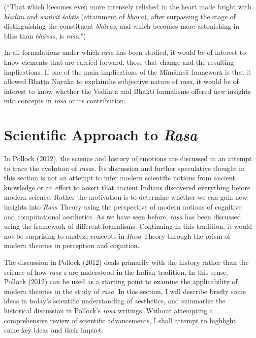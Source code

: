 (``That which becomes even more intensely relished in the heart made bright with \textsl{hlādinī} and \textsl{saṁvit} \textsl{śaktis} (attainment of \textsl{bhāva}), after surpassing the stage of distinguishing the constituent \textsl{bhāvas}, and which becomes more astonishing in bliss than \textsl{bhāvas}, is \textsl{rasa}.")

In all formulations under which \textsl{rasa} has been studied, it would be of interest to know elements that are carried forward, those that change and the resulting implications. If one of the main implications of the Mīmāṁsā framework is that it allowed Bhaṭṭa Nayaka to explain\break the subjective nature of \textsl{rasa}, it would be of interest to know whether the Vedānta and Bhakti formalisms offered new insights into concepts in \textsl{rasa} or its contribution.\\[-20pt]  

\section*{Scientific Approach to \textsl{Rasa}}

In Pollock (2012), the science and history of emotions are discussed in an attempt to trace the evolution of \textsl{rasa}s. Its discussion and further speculative thought in this section is not an attempt to infer modern scientific notions from ancient knowledge or an effort to assert that ancient Indians discovered everything before modern science. Rather the motivation is to determine whether we can gain new insights into \textsl{Rasa} Theory using the perspective of modern notions of cognitive and computational aesthetics. As we have seen before, \textsl{rasa} has been discussed using the framework of different formalisms. Continuing in this tradition, it would not be surprising to analyze concepts in \textsl{Rasa} Theory through the prism of modern theories in perception and cognition. 

The discussion in Pollock (2012) deals primarily with the history rather than the science of how \textsl{rasa}-s are understood in the Indian tradition. In this sense, Pollock (2012) can be used as a starting point to examine the applicability of modern theories in the study of \textsl{rasa}. In this section, I will describe briefly some ideas in today’s scientific understanding of aesthetics, and summarize the historical discussion in Pollock’s \textsl{rasa} writings. Without attempting a comprehensive review of scientific advancements, I shall attempt to highlight some key ideas and their impact. 


